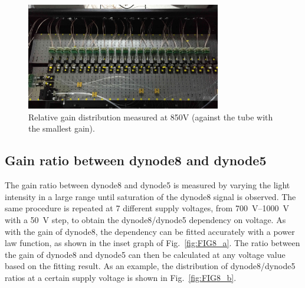 \documentclass{nst}
\begin{document}
\begin{figure}[!htb]
	\centering
	\includegraphics[width=85mm]{FIG7}
	\caption{Relative gain distribution measured at 850V (against the tube with the smallest gain).}
	\label{fig:FIG7}
\end{figure}

\subsection{Gain ratio between dynode8 and dynode5}
\label{sec:psd_dy58}

The gain ratio between dynode8 and dynode5 is measured by varying the light intensity in a large range until saturation of the dynode8 signal is observed.
The same procedure is repeated at 7 different supply voltages, from \SIrange{700}{1000}{\volt} with a \SI{50}{\volt} step, to obtain the dynode8/dynode5 dependency on voltage.
As with the gain of dynode8, the dependency can be fitted accurately with a power law function, as shown in the inset graph of Fig.~\ref{fig:FIG8_a}.
The ratio between the gain of dynode8 and dynode5 can then be calculated at any voltage value based on the fitting result.
As an example, the distribution of dynode8/dynode5 ratios at a certain supply voltage is shown in Fig.~\ref{fig:FIG8_b}.

\end{document}
